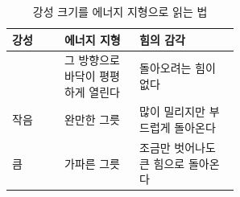 \begin{table}[!htbp]
  \centering
  \caption{강성 크기를 에너지 지형으로 읽는 법}
  \small
  \begin{tabularx}{\linewidth}{@{}>{\raggedright\arraybackslash}p{0.23\linewidth}>{\raggedright\arraybackslash}p{0.33\linewidth}>{\raggedright\arraybackslash}X@{}}
    \toprule
    강성 & 에너지 지형 & 힘의 감각 \\
    \midrule
    0 & 그 방향으로 바닥이 평평하게 열린다 & 돌아오려는 힘이 없다 \\
    작음 & 완만한 그릇 & 많이 밀리지만 부드럽게 돌아온다 \\
    큼 & 가파른 그릇 & 조금만 벗어나도 큰 힘으로 돌아온다 \\
    \bottomrule
  \end{tabularx}
\end{table}

